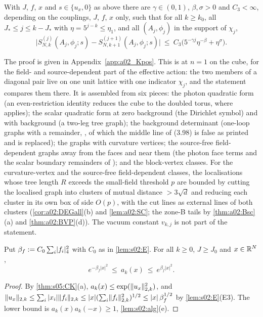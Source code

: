 \begin{proposition}\label{prop:k01:Kpos}
With $J$, $f$, $x$ and $s\in\{u_x,0\}$ as above there are $\gamma\in(0,1)$, $\beta,\sigma>0$ and $C_3<\infty$, depending on the couplings, $J$, $f$, $x$ only, such that for all $k\ge k_0$, all $J_*\le j\le k-J_*$ with $\eta=5^{j-k}\le\eta_1$, and all $(A_j,\phi_j)$ in the support of $\chi_j$,
\begin{equation}\label{eq:k01:Kpos}
\big|S^{(j)}_{N,k}(A_j,\phi_j;s)-S^{(j+1)}_{N,k+1}(A_j,\phi_j;s)\big|\ \le\ C_3\big(5^{-\gamma j}\eta^{-\beta}+\eta^{\sigma}\big).
\end{equation}
\end{proposition}
The proof is given in Appendix~\ref{app:a02_Kpos}. This is \cite[Thm.~3.4]{K1} at $n=1$ on the cube, for the field- and source-dependent part of the effective action: the two members of a diagonal pair live on one unit lattice with one indicator $\chi_j$, and the statement compares them there. It is assembled from six pieces: the photon quadratic form (an even-restriction identity reduces the cube to the doubled torus, where \cite[Prop.~3.10]{K1} applies); the scalar quadratic form at zero background (the Dirichlet symbol) and with background (a two-leg tree graph); the background determinant (one-loop graphs with a remainder, \cite[(3.94)--(3.98)]{K1}, of which the middle line of (3.98) is false as printed and is replaced); the graphs with curvature vertices; the source-free field-dependent graphs away from the faces and near them (the photon face terms and the scalar boundary remainders of \cite[pp.~331--332]{K2}); and the block-vertex classes. For the curvature-vertex and the source-free field-dependent classes, the localisations whose tree length $R$ exceeds the small-field threshold $p$ are bounded by cutting the localised graph into clusters of mutual distance $>3\sqrt d$ and reducing each cluster in its own box of side $O(p)$, with the cut lines as external lines of both clusters (\cref{cor:a02:DEGall}(b) and \cref{lem:a02:SC}; the zone-B tails by \cref{thm:a02:Bsc}(a) and \cref{thm:a02:BVP}(d)). The vacuum constant $v_{k,j}$ is not part of the statement.

\begin{lemma}\label{lem:k01:free}
Put $\beta_f:= C_0\sum_i\lvert f_i\rvert_{4}^2$ with $C_0$ as in \cref{lem:s02:E}. For all $k\ge0$, $J\ge J_0$ and $x\in\mathbb R^N$,
\[
e^{-\beta_f|x|^2}\ \le\ a_k(x)\ \le\ e^{\beta_f|x|^2}.
\]
\end{lemma}
\begin{proof}
By \cref{thm:s05:CK}(a), $a_k(x)\le\exp(\lVert u_x\rVert^2_{2,k})$, and $\lVert u_x\rVert_{2,k}\le\sum_i|x_i|\lVert f_i\rVert_{2,k}\le|x|(\sum_i\lVert f_i\rVert^2_{2,k})^{1/2}\le|x|\,\beta_f^{1/2}$ by \cref{lem:s02:E}(E3). The lower bound is $a_k(x)a_k(-x)\ge1$, \cref{lem:s02:alg}(e).
\end{proof}

